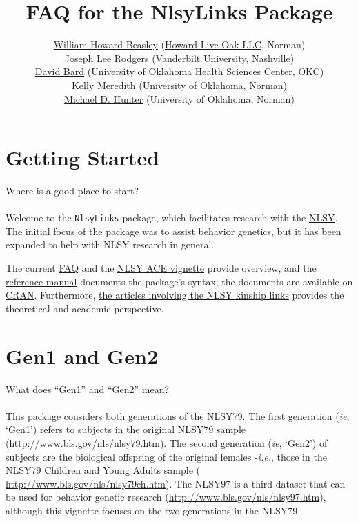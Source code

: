 \documentclass{article}\usepackage[]{graphicx}\usepackage[]{color}
\title{FAQ for the NlsyLinks Package}
\author{\href{http://scholar.google.com/citations?user=ffsJTC0AAAAJ}{William Howard Beasley} (\href{http://howardliveoak.com/}{Howard Live Oak LLC}, Norman)\\
\href{http://www.vanderbilt.edu/psychological_sciences/bio/joe-rodgers}{Joseph Lee Rodgers} (Vanderbilt University, Nashville)\\
\href{http://find.ouhsc.edu/Faculty.aspx?FacultyID=1041}{David Bard} (University of Oklahoma Health Sciences Center, OKC)\\
Kelly Meredith (University of Oklahoma, Norman)\\
\href{http://students.ou.edu/H/Michael.D.Hunter-1/}{Michael D. Hunter} (University of Oklahoma, Norman)
}
\begin{document}
\newcommand{\code}[1]{\texttt{\small{#1}}}
\newcommand{\pkg}[1]{\textsf{\small{#1}}}
\newcommand{\R}{\textsf{R}} %

\maketitle
\tableofcontents



\section{Getting Started}
\textsf{Where is a good place to start?}\\ \\
Welcome to the \code{NlsyLinks} package, which facilitates research with the \href{http://www.bls.gov/nls/home.htm}{NLSY}.  The initial focus of the package was to assist behavior genetics, but it has been expanded to help with NLSY research in general.

The current \href{http://cran.r-project.org/web/packages/NlsyLinks/vignettes/Faq.pdf}{FAQ} and the \href{http://cran.r-project.org/web/packages/NlsyLinks/vignettes/NlsyAce.pdf}{NLSY ACE vignette} provide overview, and the \href{http://cran.r-project.org/web/packages/NlsyLinks/NlsyLinks.pdf}{reference manual} documents the package's syntax; the documents are available on \href{http://cran.r-project.org/web/packages/NlsyLinks/}{CRAN}.  Furthermore, \href{https://github.com/LiveOak/NlsyLinksDetermination/wiki/Articles}{the articles involving the NLSY kinship links} provides the theoretical and academic perspective.

\section{Gen1 and Gen2}
\textsf{What does ``Gen1'' and ``Gen2'' mean?}\\ \\
This package considers both generations of the NLSY79.  The first generation (\emph{ie}, `Gen1') refers to subjects in the original NLSY79 sample (\url{http://www.bls.gov/nls/nlsy79.htm}).  The second generation (\emph{ie}, `Gen2') of subjects are the biological offspring of the original females -\emph{i.e.}, those in the NLSY79 Children and Young Adults sample ( \url{http://www.bls.gov/nls/nlsy79ch.htm}).  The NLSY97 is a third dataset that can be used for behavior genetic research (\url{http://www.bls.gov/nls/nlsy97.htm}), although this vignette focuses on the two generations in the NLSY79.
\end{document}
